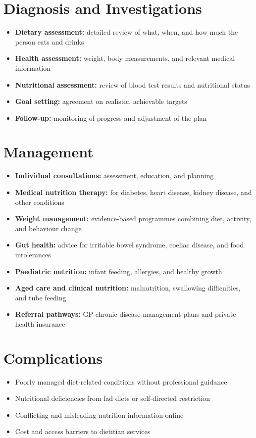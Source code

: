 \section*{Diagnosis and Investigations}
\begin{itemize}
    \item \textbf{Dietary assessment:} detailed review of what, when, and how much the person eats and drinks
    \item \textbf{Health assessment:} weight, body measurements, and relevant medical information
    \item \textbf{Nutritional assessment:} review of blood test results and nutritional status
    \item \textbf{Goal setting:} agreement on realistic, achievable targets
    \item \textbf{Follow-up:} monitoring of progress and adjustment of the plan
\end{itemize}

\section*{Management}
\begin{itemize}
    \item \textbf{Individual consultations:} assessment, education, and planning
    \item \textbf{Medical nutrition therapy:} for diabetes, heart disease, kidney disease, and other conditions
    \item \textbf{Weight management:} evidence-based programmes combining diet, activity, and behaviour change
    \item \textbf{Gut health:} advice for irritable bowel syndrome, coeliac disease, and food intolerances
    \item \textbf{Paediatric nutrition:} infant feeding, allergies, and healthy growth
    \item \textbf{Aged care and clinical nutrition:} malnutrition, swallowing difficulties, and tube feeding
    \item \textbf{Referral pathways:} GP chronic disease management plans and private health insurance
\end{itemize}

\section*{Complications}
\begin{itemize}
    \item Poorly managed diet-related conditions without professional guidance
    \item Nutritional deficiencies from fad diets or self-directed restriction
    \item Conflicting and misleading nutrition information online
    \item Cost and access barriers to dietitian services
\end{itemize}

